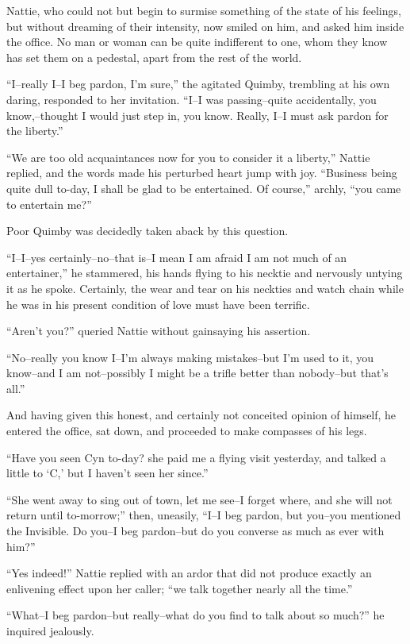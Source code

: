 Nattie, who could not but begin to surmise something of the state of his
feelings, but without dreaming of their intensity, now smiled on him,
and asked him inside the office. No man or woman can be quite
indifferent to one, whom they know has set them on a pedestal, apart
from the rest of the world.

``I--really I--I beg pardon, I'm sure,'' the agitated Quimby, trembling at
his own daring, responded to her invitation. ``I--I was passing--quite
accidentally, you know,--thought I would just step in, you know. Really,
I--I must ask pardon for the liberty.''

``We are too old acquaintances now for you to consider it a liberty,''
Nattie replied, and the words made his perturbed heart jump with joy.
``Business being quite dull to-day, I shall be glad to be entertained. Of
course,'' archly, ``you came to entertain me?''

Poor Quimby was decidedly taken aback by this question.

``I--I--yes certainly--no--that is--I mean I am afraid I am not much of
an entertainer,'' he stammered, his hands flying to his necktie and
nervously untying it as he spoke. Certainly, the wear and tear on his
neckties and watch chain while he was in his present condition of love
must have been terrific.

``Aren't you?'' queried Nattie without gainsaying his assertion.

``No--really you know I--I'm always making mistakes--but I'm used to it,
you know--and I am not--possibly I might be a trifle better than
nobody--but that's all.''

And having given this honest, and certainly not conceited opinion of
himself, he entered the office, sat down, and proceeded to make
compasses of his legs.

``Have you seen Cyn to-day? she paid me a flying visit yesterday, and
talked a little to `C,' but I haven't seen her since.''

``She went away to sing out of town, let me see--I forget where, and she
will not return until to-morrow;'' then, uneasily, ``I--I beg pardon, but
you--you mentioned the Invisible. Do you--I beg pardon--but do you
converse as much as ever with him?''

``Yes indeed!'' Nattie replied with an ardor that did not produce exactly
an enlivening effect upon her caller; ``we talk together nearly all the
time.''

``What--I beg pardon--but really--what do you find to talk about so
much?'' he inquired jealously.

